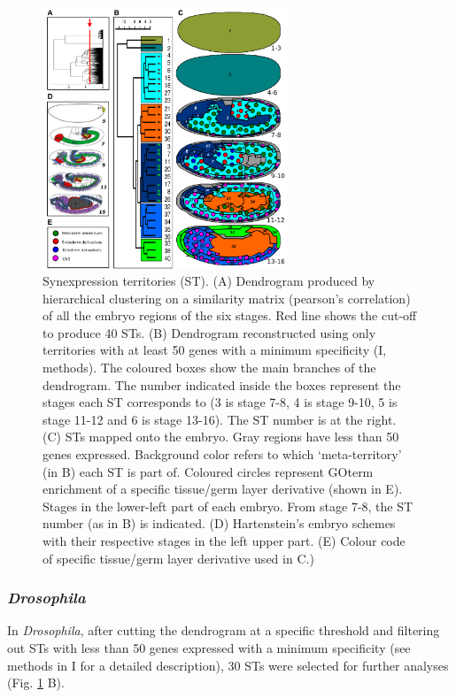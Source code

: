 \begin{figure}[!t]
  \includegraphics[width=0.65\textwidth]{./Images/Art-I/territories.png}
  \centering
  \caption{Synexpression territories (ST). (A) Dendrogram produced by hierarchical clustering on a similarity matrix (pearson's correlation) of all the embryo regions of the six stages. Red line shows the cut-off to produce 40 STs. (B) Dendrogram reconstructed using only territories with at least 50 genes with a minimum specificity (I, methods). The coloured boxes show the main branches of the dendrogram. The number indicated inside the boxes represent the stages each ST corresponds to (3 is stage 7-8, 4 is stage 9-10, 5 is stage 11-12 and 6 is stage 13-16). The ST number is at the right. (C) STs mapped onto the embryo. Gray regions have less than 50 genes expressed. Background color refers to which `meta-territory' (in B) each ST is part of. Coloured circles represent GOterm enrichment of a specific tissue/germ layer derivative (shown in E). Stages in the lower-left part of each embryo. From stage 7-8, the ST number (as in B) is indicated. (D) Hartenstein's embryo schemes \citep{Hartenstein1993} with their respective stages in the left upper part. (E) Colour code of specific tissue/germ layer derivative used in C.)}
  \label{fig:Art-I-territories}
\end{figure}
\subsubsection{\textit{Drosophila}}
In \textit{Drosophila}, after cutting the dendrogram at a specific threshold and filtering out STs with less than 50 genes expressed with a minimum specificity (see methods in I for a detailed description), 30 STs were selected for further analyses (Fig. \ref{fig:Art-I-territories} B).

